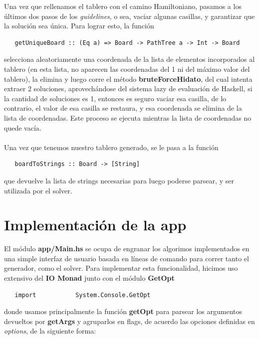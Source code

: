 \documentclass[a4paper, 12pt]{article}
\begin{document}
Una vez que rellenamos el tablero con el camino Hamiltoniano, pasamos a los \'ultimos dos pasos de los \textit{guidelines},
o sea, vaciar algunas casillas, y garantizar que la soluci\'on sea \'unica. Para lograr esto, la funci\'on

\begin{verbatim}
   getUniqueBoard :: (Eq a) => Board -> PathTree a -> Int -> Board
\end{verbatim}
selecciona aleatoriamente una coordenada de la lista de elementos incorporados al tablero (en esta lista, no aparecen
las coordenadas del 1 ni del m\'aximo valor del tablero), la elimina y luego corre el m\'etodo \textbf{bruteForceHidato}, del
cual intenta extraer 2 soluciones, aprovech\'andose del sistema lazy de evaluaci\'on de Haskell, si la cantidad de soluciones
es 1, entonces es seguro vaciar esa casilla, de lo contrario, el valor de esa casilla se restaura, y esa coordenada se elimina
de la lista de coordenadas. Este proceso se ejecuta mientras la lista de coordenadas no quede vac\'ia.

\paragraph{}
Una vez que tenemos nuestro tablero generado, se le pasa a la funci\'on

\begin{verbatim}
   boardToStrings :: Board -> [String]
\end{verbatim}
que devuelve la lista de strings necesarias para luego poderse parsear, y ser utilizada por el solver.

\section*{Implementaci\'on de la app}
El m\'odulo \textbf{app/Main.hs} se ocupa de engranar los algorimos implementados en una simple interfaz
de usuario basada en l\'ineas de comando para correr tanto el generador, como el solver. Para implementar
esta funcionalidad, hicimos uso extensivo del \textbf{IO Monad} junto con el m\'odulo \textbf{GetOpt}

\begin{verbatim}
   import           System.Console.GetOpt
\end{verbatim}
donde usamos principalmente la funci\'on \textbf{getOpt} para parsear los argumentos devueltos por 
\textbf{getArgs} y agruparlos en flags, de acuerdo las opciones definidas en \textit{options}, de la 
siguiente forma:
\end{document}
